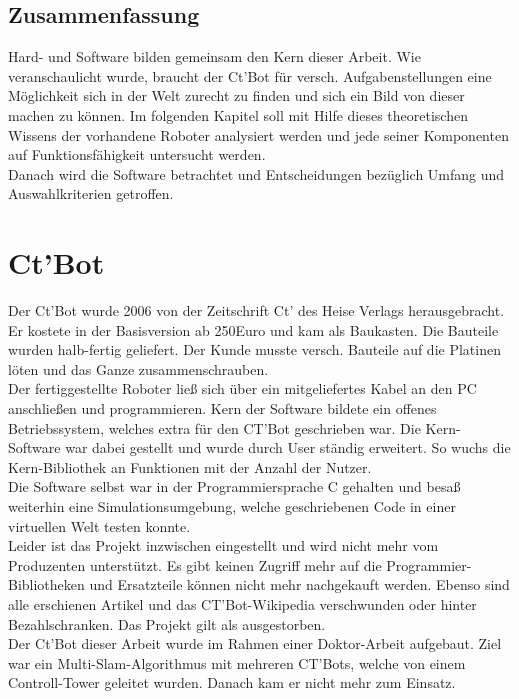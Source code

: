 \documentclass[a4paper,cleardoubleempty,BCOR1cm]{book}
\begin{document}
\section{Zusammenfassung}
Hard- und Software bilden gemeinsam den Kern dieser Arbeit. Wie veranschaulicht wurde, braucht der Ct'Bot für versch. Aufgabenstellungen eine Möglichkeit sich in der Welt zurecht zu finden und sich ein Bild von dieser machen zu können. Im folgenden Kapitel soll mit Hilfe dieses theoretischen Wissens der vorhandene Roboter analysiert werden und jede seiner Komponenten auf Funktionsfähigkeit untersucht werden. \\
Danach wird die Software betrachtet und Entscheidungen bezüglich Umfang und Auswahlkriterien getroffen. 









\chapter{Ct'Bot}
Der Ct'Bot wurde 2006 von der Zeitschrift Ct' des Heise Verlags herausgebracht. Er kostete in der Basisversion ab 250Euro und kam als Baukasten. Die Bauteile wurden halb-fertig geliefert. Der Kunde musste versch. Bauteile auf die Platinen löten und das Ganze zusammenschrauben. \\
Der fertiggestellte Roboter ließ sich über ein mitgeliefertes Kabel an den PC anschließen und programmieren. Kern der Software bildete ein offenes Betriebssystem, welches extra für den CT'Bot geschrieben war. Die Kern-Software war dabei gestellt und wurde durch User ständig erweitert. So wuchs die Kern-Bibliothek an Funktionen mit der Anzahl der Nutzer. \\
Die Software selbst war in der Programmiersprache C gehalten und besaß weiterhin eine Simulationsumgebung, welche geschriebenen Code in einer virtuellen Welt testen konnte. \\
Leider ist das Projekt inzwischen eingestellt und wird nicht mehr vom Produzenten unterstützt. Es gibt keinen Zugriff mehr auf die Programmier-Bibliotheken und Ersatzteile können nicht mehr nachgekauft werden. Ebenso sind alle erschienen Artikel und das CT'Bot-Wikipedia verschwunden oder hinter Bezahlschranken. Das Projekt gilt als ausgestorben. \\
Der Ct'Bot dieser Arbeit wurde im Rahmen einer Doktor-Arbeit aufgebaut. Ziel war ein Multi-Slam-Algorithmus mit mehreren CT'Bots, welche von einem Controll-Tower geleitet wurden. Danach kam er nicht mehr zum Einsatz. 
\end{document}
